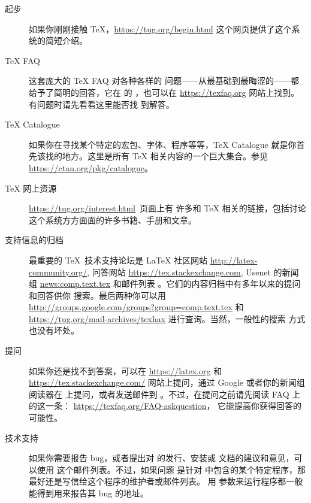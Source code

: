 \documentclass{article}
\begin{document}
\begin{description}
  \item [起步] 如果你刚刚接触 \TeX，\url{https://tug.org/begin.html}
        这个网页提供了这个系统的简短介绍。

  \item [\TeX{} FAQ] 这套庞大的 \TeX{} FAQ 对各种各样的
        问题——从最基础到最晦涩的——都给予了简明的回答，它在 \TL{} 的
        ，也可以在
        \url{https://texfaq.org} 网站上找到。有问题时请先看看这里能否找
        到解答。

  \item [\TeX{} Catalogue] 如果你在寻找某个特定的宏包、字体、程序等等，\TeX{}
        Catalogue 就是你首先该找的地方。这里是所有 \TeX{} 相关内容的一个巨大集合。参见
        \url{https://ctan.org/pkg/catalogue}。

  \item [\TeX{} 网上资源] \url{https://tug.org/interest.html}~页面上有
        许多和 \TeX{} 相关的链接，包括讨论这个系统方方面面的许多书籍、手册和文章。

  \item [支持信息的归档] 最重要的 \TeX\ 技术支持论坛是
        \LaTeX{} 社区网站 \url{http://latex-community.org/}, 问答网站
        \url{https://tex.stackexchange.com}, Usenet 的新闻组 \url{news:comp.text.tex}
        和邮件列表 。它们的内容归档中有多年以来的提问和回答供你
        搜索。最后两种你可以用 \\
        \url{http://groups.google.com/groups?group=comp.text.tex} 和 \\
        \url{https://tug.org/mail-archives/texhax} 进行查询。当然，一般性的搜索
        方式也没有坏处。

  \item [提问] 如果你还是找不到答案，可以在 \url{https://latex.org} 和
        \url{https://tex.stackexchange.com/} 网站上提问，通过 Google
        或者你的新闻组阅读器在  上提问，或者发送邮件到
        。不过，在提问之前请先阅读 FAQ 上的这一条：
        \url{https://texfaq.org/FAQ-askquestion}，
        它能提高你获得回答的可能性。

  \item [\TL{} 技术支持] 如果你需要报告 bug，或者提出对 \TL{} 的发行、安装或
        文档的建议和意见，可以使用  这个邮件列表。不过，如果问题
        是针对 \TL{} 中包含的某个特定程序，那最好还是写信给这个程序的维护者或邮件列表。
        用  参数来运行程序都一般能得到用来报告其 bug 的地址。

\end{description}
\end{document}
